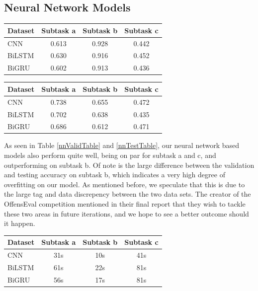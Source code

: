 \documentclass[a4paper, 12pt]{article}
\begin{document}
\begin{multicols}{2}
        \newpage
        \subsection{Neural Network Models}
        \begin{center}
            \begin{tabular}{l|ccc}
                Dataset & Subtask a & Subtask b & Subtask c \\
                \hline
                CNN & 0.613 & 0.928 & 0.442 \\
                BiLSTM & 0.630 & 0.916 & 0.452 \\
                BiGRU & 0.602 & 0.913 & 0.436
            \end{tabular}       
            \label{nnValidTable}
        \end{center}

        \begin{center}
            \begin{tabular}{l|ccc}
                Dataset & Subtask a & Subtask b & Subtask c \\
                \hline
                CNN & 0.738 & 0.655 & 0.472 \\
                BiLSTM & 0.702 & 0.638 & 0.435 \\
                BiGRU & 0.686 & 0.612 & 0.471
            \end{tabular}       
            \label{nnTestTable}
        \end{center}
        
        As seen in Table \ref{nnValidTable} and \ref{nnTestTable}, our neural network based models also perform quite well, being on par for subtask a and c, and outperforming on subtask b. Of note is the large difference between the validation and testing accuracy on subtask b, which indicates a very high degree of overfitting on our model. As mentioned before, we speculate that this is due to the large tag and data discrepency between the two data sets. The creator of the OffensEval competition mentioned in their final report that they wish to tackle these two areas in future iterations, and we hope to see a better outcome should it happen.
        \begin{center}
            \begin{tabular}{l|ccc}
                Dataset & Subtask a & Subtask b & Subtask c \\
                \hline
                CNN & 31s & 10s & 41s \\
                BiLSTM & 61s & 22s & 81s \\
                BiGRU & 56s & 17s & 81s
            \end{tabular}       
            \label{nnTimeTable}
        \end{center}


\end{multicols}
\end{document}
